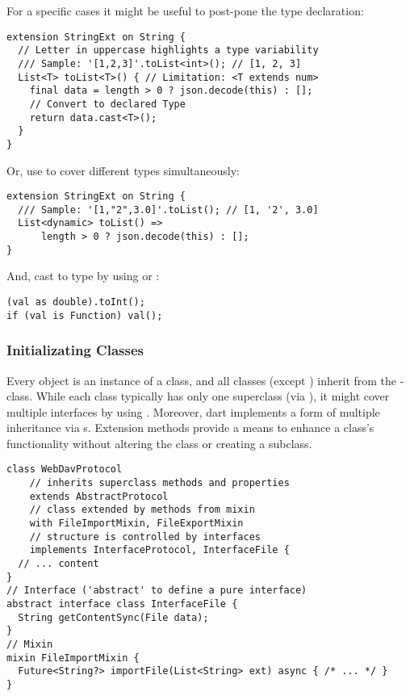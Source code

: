 For a specific cases it might be useful to post-pone the type declaration:

\begin{lstlisting}
extension StringExt on String {
  // Letter in uppercase highlights a type variability
  /// Sample: '[1,2,3]'.toList<int>(); // [1, 2, 3] 
  List<T> toList<T>() { // Limitation: <T extends num>
    final data = length > 0 ? json.decode(this) : [];
    // Convert to declared Type
    return data.cast<T>();
  }
}
\end{lstlisting}

\noindent Or, use  to cover different types simultaneously:

\begin{lstlisting}
extension StringExt on String {
  /// Sample: '[1,"2",3.0]'.toList(); // [1, '2', 3.0] 
  List<dynamic> toList() =>
      length > 0 ? json.decode(this) : [];
}
\end{lstlisting}

\noindent And, cast to type by using  or :

\begin{lstlisting}
(val as double).toInt();
if (val is Function) val();
\end{lstlisting}


\subsubsection{Initializating Classes}

Every object is an instance of a class, and all classes (except ) inherit from the -class. While each 
class typically has only one superclass (via ), it might cover multiple interfaces by using .
Moreover, dart implements a form of multiple inheritance via s. Extension methods provide a means to 
enhance a class's functionality without altering the class or creating a subclass.

\begin{lstlisting}
class WebDavProtocol
    // inherits superclass methods and properties
    extends AbstractProtocol 
    // class extended by methods from mixin
    with FileImportMixin, FileExportMixin 
    // structure is controlled by interfaces
    implements InterfaceProtocol, InterfaceFile {
  // ... content
}
// Interface ('abstract' to define a pure interface)
abstract interface class InterfaceFile {
  String getContentSync(File data);
}
// Mixin
mixin FileImportMixin {
  Future<String?> importFile(List<String> ext) async { /* ... */ }
}
\end{lstlisting}
  
